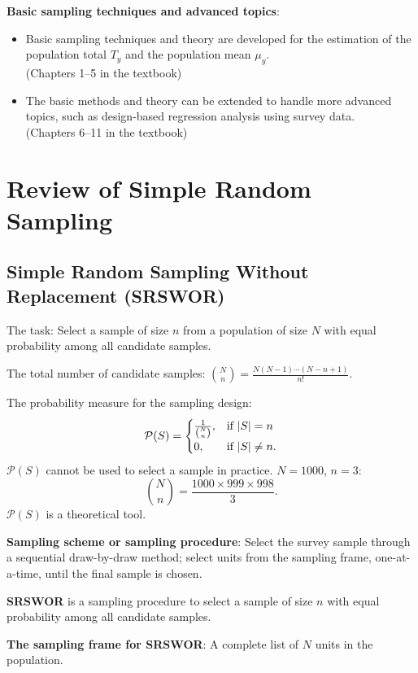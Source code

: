 \textbf{Basic sampling techniques and advanced topics}:
\begin{itemize}
      \item Basic sampling techniques and theory are developed for the
            estimation of the population total $T_y$ and the population mean $ \mu_y $.\\
            (Chapters 1--5 in the textbook)
      \item The basic methods and theory can be extended to handle more
            advanced topics, such as design-based regression analysis using
            survey data.\\
            (Chapters 6--11 in the textbook)
\end{itemize}

\chapter{Review of Simple Random Sampling}
\section{Simple Random Sampling Without Replacement (SRSWOR)}
The task: Select a sample of size $n$ from a population of size $N$ with
equal probability among all candidate samples.

The total number of candidate samples: $ \binom{N}{n}=\frac{N(N-1)\cdots(N-n+1)}{n!} $.

The probability measure for the sampling design:
\[ \mathcal{P}(S)
      =\begin{cases}
            \frac{1}{\binom{N}{n}}, & \text{if $\lvert S\rvert=n$}     \\
            0,                      & \text{if $\lvert S\rvert\ne n$}.
      \end{cases} \]
$ \mathcal{P}(S) $ cannot be used to select a sample in practice. $ N=1000 $, $ n=3 $:
\[ \binom{N}{n}=\frac{1000\times 999\times 998}{3}. \]
$ \mathcal{P}(S) $ is a theoretical tool.

\textbf{Sampling scheme or sampling procedure}:
Select the survey sample through a sequential draw-by-draw method;
select units from the sampling frame, one-at-a-time, until the final
sample is chosen.

\textbf{SRSWOR} is a sampling procedure to select a sample of size $n$ with
equal probability among all candidate samples.

\textbf{The sampling frame for SRSWOR}:
A complete list of $N$ units in the population.

